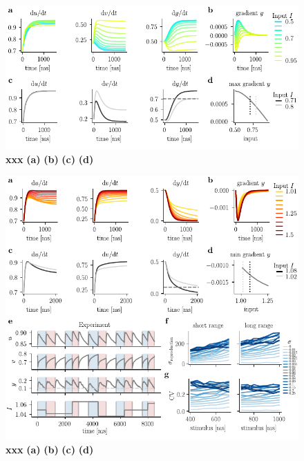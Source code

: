 \documentclass[10pt]{article}
\begin{document}

\begin{figure}[ht]
	\centering
	\includegraphics{figures/supp_interIregime.pdf}
	\caption{\textbf{xxx}
	\textbf{(a)}
	\textbf{(b)}
	\textbf{(c)} 
	\textbf{(d)} 
	}
\label{sup:interI}
\end{figure}

\begin{figure}[ht]
	\centering
	\includegraphics{figures/supp_highI.pdf}
	\caption{\textbf{xxx}
	\textbf{(a)}
	\textbf{(b)}
	\textbf{(c)} 
	\textbf{(d)} 
	}
\label{sup:highI}
\end{figure}
\end{document}
